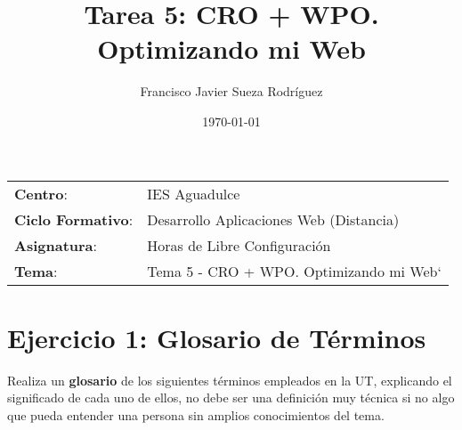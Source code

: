 


\title{
\vspace{10ex}
\normalfont \normalsize
\huge \textbf{Tarea 5: CRO + WPO. Optimizando mi Web}
}
\author{Francisco Javier Sueza Rodríguez}
\date{\normalsize\today}



\maketitle

\thispagestyle{empty}

\vspace{65ex}

\begin{center}
    \begin{tabular}{l l}
        \textbf{Centro}: & IES Aguadulce \\
        \textbf{Ciclo Formativo}: & Desarrollo Aplicaciones Web (Distancia)\\
        \textbf{Asignatura}: & Horas de Libre Configuración\\
        \textbf{Tema}: & Tema 5 - CRO + WPO. Optimizando mi Web`\\
    \end{tabular}
\end{center}

\newpage

\tableofcontents

\vspace{15ex}

\listoffigures

\newpage

\section{Ejercicio 1: Glosario de Términos}
Realiza un \textbf{glosario} de los siguientes términos empleados en la UT, explicando el significado de cada uno de ellos, no debe ser una definición muy técnica si no algo que pueda entender una persona sin amplios conocimientos del tema.

